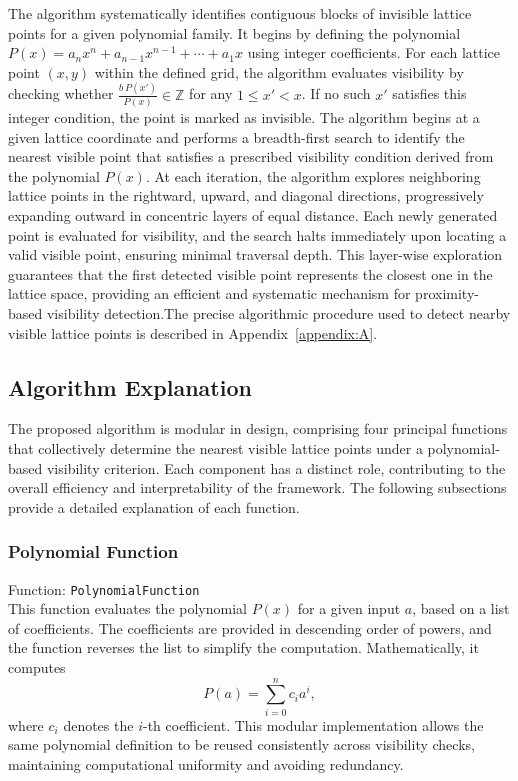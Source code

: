 \documentclass[12pt, reqno]{amsart}
\theoremstyle{definition}
\theoremstyle{remark}
\numberwithin{equation}{section}
\begin{document}
The algorithm systematically identifies contiguous blocks of invisible lattice points for a given polynomial family. 
It begins by defining the polynomial 
$P(x) = a_nx^n + a_{n-1}x^{n-1} + \cdots + a_1x$ 
using integer coefficients. 
For each lattice point $(x, y)$ within the defined grid, the algorithm evaluates visibility by checking whether 
$\frac{b\,P(x')}{P(x)} \in \mathbb{Z}$ for any $1 \leq x' < x$. 
If no such $x'$ satisfies this integer condition, the point is marked as invisible. 
The algorithm begins at a given lattice coordinate and performs a breadth-first search to identify the nearest visible point that satisfies a prescribed visibility condition derived from the polynomial $P(x)$. At each iteration, the algorithm explores neighboring lattice points in the rightward, upward, and diagonal directions, progressively expanding outward in concentric layers of equal distance. Each newly generated point is evaluated for visibility, and the search halts immediately upon locating a valid visible point, ensuring minimal traversal depth. This layer-wise exploration guarantees that the first detected visible point represents the closest one in the lattice space, providing an efficient and systematic mechanism for proximity-based visibility detection.The precise algorithmic procedure used to detect nearby visible lattice points is described in Appendix~\ref{appendix:A}.



\subsection{Algorithm Explanation}

The proposed algorithm is modular in design, comprising four principal functions that collectively determine the nearest visible lattice points under a polynomial-based visibility criterion. Each component has a distinct role, contributing to the overall efficiency and interpretability of the framework. The following subsections provide a detailed explanation of each function.

\subsubsection{Polynomial Function}
{Function: \texttt{PolynomialFunction}}\\
This function evaluates the polynomial $P(x)$ for a given input $a$, based on a list of coefficients. The coefficients are provided in descending order of powers, and the function reverses the list to simplify the computation. Mathematically, it computes
\[
P(a) = \sum_{i=0}^{n} c_i a^i,
\]
where $c_i$ denotes the $i$-th coefficient.  
This modular implementation allows the same polynomial definition to be reused consistently across visibility checks, maintaining computational uniformity and avoiding redundancy.
\end{document}
